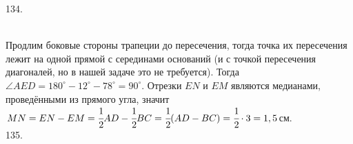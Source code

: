\documentclass[12pt]{article}
\begin{document}
134. \begin{figure}[ht!]
\end{figure}\\
Продлим боковые стороны трапеции до пересечения, тогда точка их пересечения лежит на одной прямой с серединами оснований (и с точкой пересечения диагоналей, но в нашей задаче это не требуется). Тогда $\angle AED=180^\circ-12^\circ-78^\circ=90^\circ.$ Отрезки $EN$ и $EM$ являются медианами, проведёнными из прямого угла, значит $MN=EN-EM=\cfrac{1}{2}AD-\cfrac{1}{2}BC=\cfrac{1}{2}(AD-BC)=\cfrac{1}{2}\cdot3=1,5$см.\\
135. \begin{figure}[ht!]
\end{figure}\\
\end{document}
